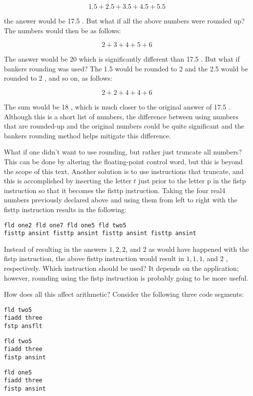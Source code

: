 \documentclass[10pt]{article}
\begin{document}
$$
1.5+2.5+3.5+4.5+5.5
$$

the answer would be 17.5 . But what if all the above numbers were rounded up? The numbers would then be as follows:

$$
2+3+4+5+6
$$

The answer would be 20 which is significantly different than 17.5 . But what if bankers rounding was used? The 1.5 would be rounded to 2 and the 2.5 would be rounded to 2 , and so on, as follows:

$$
2+2+4+4+6
$$

The sum would be 18 , which is much closer to the original answer of 17.5 . Although this is a short list of numbers, the difference between using numbers that are rounded-up and the original numbers could be quite significant and the bankers rounding method helps mitigate this difference.

What if one didn't want to use rounding, but rather just truncate all numbers? This can be done by altering the floating-point control word, but this is beyond the scope of this text. Another solution is to use instructions that truncate, and this is accomplished by inserting the letter $t$ just prior to the letter p in the fistp instruction so that it becomes the fisttp instruction. Taking the four real4 numbers previously declared above and using them from left to right with the fisttp instruction results in the following:

\begin{verbatim}
fld one2 fld one7 fld one5 fld two5
fisttp ansint fisttp ansint fisttp ansint fisttp ansint
\end{verbatim}

Instead of resulting in the answers $1,2,2$, and 2 as would have happened with the fistp instruction, the above fisttp instruction would result in $1,1,1$, and 2 , respectively. Which instruction should be used? It depends on the application; however, rounding using the fistp instruction is probably going to be more useful.

How does all this affect arithmetic? Consider the following three code segments:

\begin{verbatim}
fld two5
fiadd three
fstp ansflt
\end{verbatim}

\begin{verbatim}
fld two5
fiadd three
fistp ansint
\end{verbatim}

\begin{verbatim}
fld one5
fiadd three
fistp ansint
\end{verbatim}
\end{document}
